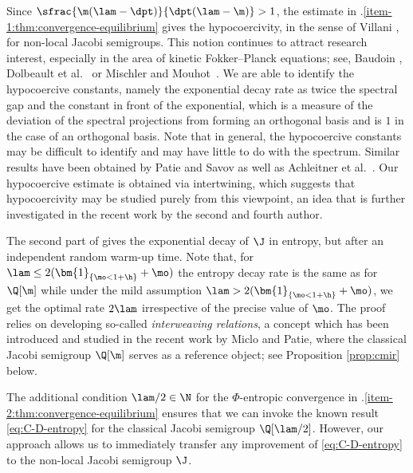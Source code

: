 \begin{remark}
Since $\sfrac{\m(\lam-\dpt)}{\dpt(\lam-\m)} > 1$, the estimate in .\eqref{item-1:thm:convergence-equilibrium} gives the hypocoercivity, in the sense of Villani \cite{Villani-09}, for non-local Jacobi semigroups. This notion continues to attract research interest, especially in the area of kinetic Fokker--Planck equations; see, \eg Baudoin \cite{Baudoin}, Dolbeault et al.~\cite{Mouhot} or Mischler and Mouhot~\cite{Mischler2016}. We are able to identify the hypocoercive constants, namely the exponential decay rate as twice the spectral gap and the constant in front of the exponential, which is a measure of the deviation of the spectral projections from forming an orthogonal basis and is $1$ in the case of an orthogonal basis. Note that in general, the hypocoercive constants may be difficult to identify and may have little to do with the spectrum. Similar results have been obtained by Patie and Savov \cite{Patie-Savov-GeL} as well as Achleitner et al.~\cite{BGK}. Our hypocoercive estimate is obtained via intertwining, which suggests that hypocoercivity may be studied purely from this viewpoint, an idea that is further investigated in the recent work \cite{PV-Hypo} by the second and fourth author.
\end{remark}

\begin{remark}
The second part of  gives the exponential decay of $\J$ in entropy, but after an independent random warm-up time. Note that, for $\lam \leq 2(\bm{1}_{\{\mo < 1+\h \}} + \mo)$ the entropy decay rate is the same as for $\Q[\m]$ while under the mild assumption $\lam > 2(\bm{1}_{\{\mo < 1+\h \}} + \mo)$, we get the optimal rate $2 \lam$
irrespective of the precise value of $\mo$. The proof relies on developing so-called \emph{interweaving relations}, a concept which has been introduced and studied in the recent work \cite{Patie-Miclo} by Miclo and Patie, where the classical Jacobi semigroup $\Q[\m]$ serves as a reference object; see Proposition \ref{prop:cmir} below.
\end{remark}

\begin{remark}
The additional condition $\lam/2 \in \N$ for the $\Phi$-entropic convergence in .\eqref{item-2:thm:convergence-equilibrium} ensures that we can invoke the known result \eqref{eq:C-D-entropy} for the classical Jacobi semigroup $\Q[\lam/2]$. However, our approach allows us to immediately transfer any improvement of \eqref{eq:C-D-entropy} to the non-local Jacobi semigroup $\J$.
\end{remark}

